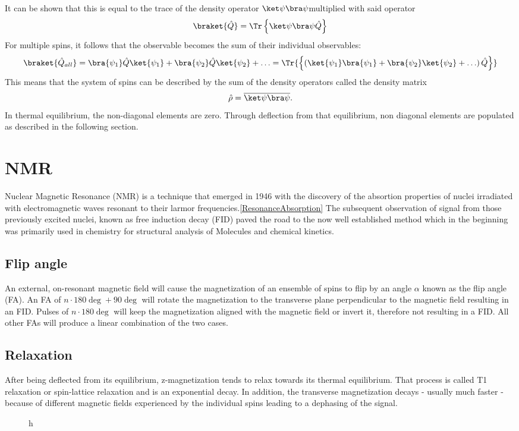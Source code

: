 	It can be shown that this is equal to the trace of the density operator 
	$\ket\psi\bra\psi$multiplied with said operator
	\begin{equation}
		\braket{\hat Q} = \Tr \left\{\ket\psi\bra\psi\hat Q\right\}
	\end{equation}
	For multiple spins, it follows that the observable becomes the sum of their individual
	observables:
	\begin{equation}
		\braket{\hat Q_{all}}= \bra{\psi_1}\hat Q\ket{\psi_1} + \bra{\psi_2}\hat Q\ket{\psi_2} + \hdots =
		\Tr{\left\{\left(\ket{\psi_1}\bra{\psi_1} + \bra{\psi_2}\ket{\psi_2}+ \hdots \right) \hat Q\right\}}
	\end{equation}
	This means that the system of spins can be described by the sum of the density operators called
	the density matrix
	\begin{equation}
		\hat\rho = \overline{\ket\psi\bra\psi}.
	\end{equation}
	In thermal equilibrium, the non-diagonal elements are zero. Through deflection from that
	equilibrium, non diagonal elements are populated as described in the following section.
	\section{NMR}
	Nuclear Magnetic Resonance (NMR) is a technique that emerged in 1946 with the discovery
	of the absortion properties of nuclei irradiated with electromagnetic waves resonant to their
	larmor frequencies.\ref{ResonanceAbsorption} The subsequent observation of signal from those
	previously excited nuclei, known as free induction decay (FID) paved the road to the now well
	established method which in the beginning was primarily used in chemistry for structural
	analysis of Molecules and chemical kinetics.
		\subsection{Flip angle}
			An external, on-resonant magnetic field will cause the magnetization of an ensemble of
			spins to flip by an angle $\alpha$ known as the flip angle (FA). An FA of $n\cdot 180
			\deg + 90 \deg$ will rotate the magnetization to the transverse plane perpendicular to the magnetic field
			resulting in an FID. Pulses of $n\cdot 180 \deg$ will keep the magnetization aligned
			with the magnetic field or invert it, therefore not resulting in a FID. All other FAs
			will produce a linear combination of the two cases.
		\subsection{Relaxation}
			After being deflected from its equilibrium, z-magnetization tends to relax towards its
			thermal equilibrium. That process is called T1 relaxation or spin-lattice relaxation and
			is an exponential decay. In addition, the transverse magnetization decays - usually much
			faster - because of different magnetic fields experienced by the individual spins
			leading to a dephasing of the signal.
			\begin{figure}{h}
			\end{figure}
